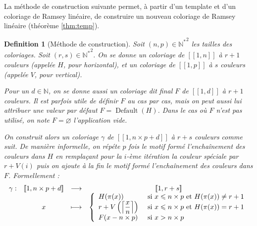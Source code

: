 \documentclass{article}
\newtheorem{definition}{Definition}[section]
\DeclareMathOperator{\coldef}{Default}
\begin{document}
La méthode de construction suivante permet, à partir d'un template et d'un coloriage de Ramsey linéaire, de construire un nouveau coloriage de Ramsey linéaire (théorème \ref{thm:temp}).

\begin{definition}[Méthode de construction]
Soit \((n, p) \in {\mathbb{N}^*}^2\) les tailles des coloriages. Soit \((r, s) \in {\mathbb{N}^*}^2\). On se donne un coloriage de \([\![1, n]\!]\) à \(r + 1\) couleurs (appelée \(H\), pour horizontal), et un coloriage de \([\![1, p]\!]\) à \(s\) couleurs (appelée \(V\), pour vertical).

Pour un \(d \in \mathbb{N}\), on se donne aussi un coloriage dit final \(F\) de \([\![1, d]\!]\) à \(r + 1\) couleurs. Il est parfois utile de définir \(F\) au cas par cas, mais on peut aussi lui attribuer une valeur par défaut \(F = \coldef(H)\). Dans le cas où \(F\) n'est pas utilisé, on note \(F = \varnothing\) l'application vide. 

On construit alors un coloriage \(\gamma\) de \([\![1, n \times p + d]\!]\) à \(r + s\) couleurs comme suit. De manière informelle, on répéte \(p\) fois le motif formé l'enchaînement des couleurs dans \(H\) en remplaçant pour la \(i\)-ème itération la couleur spéciale par \(r + V(i)\) puis on ajoute à la fin le motif formé l'enchaînement des couleurs dans \(F\). Formellement :
\[\begin{array}{c c c c}
	\gamma: & [\![1, n \times p + d]\!]  & \longrightarrow &  [\![1, r + s]\!] \\
 	& x & \longmapsto & 
		\left\{\begin{array}{l l}
			H(\pi(x)) & ~\text{si}~ x \leqslant n \times p ~\text{et}~ H(\pi(x)) \neq r + 1 \\
			r + V \left(\left\lceil \dfrac{x}{n} \right\rceil\right) & ~\text{si}~ x \leqslant n \times p ~\text{et}~ H(\pi(x)) = r + 1 \\
			F(x - n \times p) & ~\text{si}~ x > n \times p
		\end{array}\right.
\end{array}\]
\end{definition}
\end{document}
